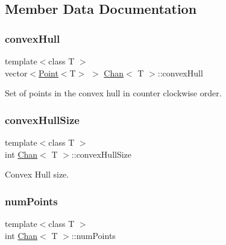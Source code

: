 \subsection{Member Data Documentation}
\mbox{\label{classChan_a6b189fb8de493f51a989f5c90dc7bbcc}} 
\subsubsection{\texorpdfstring{convex\+Hull}{convexHull}}
{\footnotesize\ttfamily template$<$class T $>$ \\
vector$<$\mbox{\hyperlink{classPoint}{Point}}$<$T$>$ $>$ \mbox{\hyperlink{classChan}{Chan}}$<$ T $>$\+::convex\+Hull\hspace{0.3cm}{\ttfamily [private]}}



Set of points in the convex hull in counter clockwise order. 

\mbox{\label{classChan_a366f3dd178f14b5e146e6a80aea8e039}} 
\subsubsection{\texorpdfstring{convex\+Hull\+Size}{convexHullSize}}
{\footnotesize\ttfamily template$<$class T $>$ \\
int \mbox{\hyperlink{classChan}{Chan}}$<$ T $>$\+::convex\+Hull\+Size\hspace{0.3cm}{\ttfamily [private]}}



Convex Hull size. 

\mbox{\label{classChan_a9f5d5339db322fa4a378af0832b31da9}} 
\subsubsection{\texorpdfstring{num\+Points}{numPoints}}
{\footnotesize\ttfamily template$<$class T $>$ \\
int \mbox{\hyperlink{classChan}{Chan}}$<$ T $>$\+::num\+Points\hspace{0.3cm}{\ttfamily [private]}}



